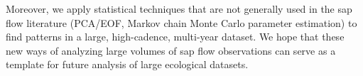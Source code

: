 Moreover, we apply statistical techniques that are not generally used in the sap flow literature (PCA/EOF, Markov chain Monte Carlo parameter estimation) to find patterns in a large, high-cadence, multi-year dataset.  We hope that these new ways of analyzing large volumes of sap flow observations can serve as a template for future analysis of large ecological datasets.